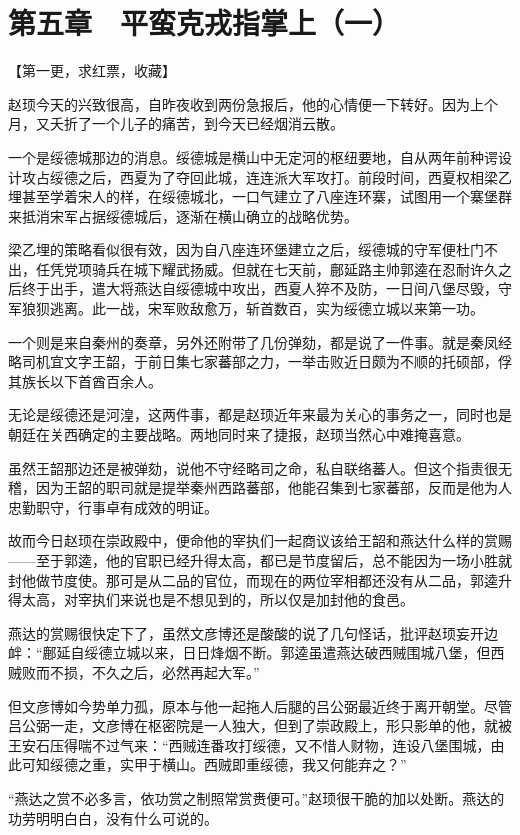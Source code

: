 \section{第五章　平蛮克戎指掌上（一）}

【第一更，求红票，收藏】

赵顼今天的兴致很高，自昨夜收到两份急报后，他的心情便一下转好。因为上个月，又夭折了一个儿子的痛苦，到今天已经烟消云散。

一个是绥德城那边的消息。绥德城是横山中无定河的枢纽要地，自从两年前种谔设计攻占绥德之后，西夏为了夺回此城，连连派大军攻打。前段时间，西夏权相梁乙埋甚至学着宋人的样，在绥德城北，一口气建立了八座连环寨，试图用一个寨堡群来抵消宋军占据绥德城后，逐渐在横山确立的战略优势。

梁乙埋的策略看似很有效，因为自八座连环堡建立之后，绥德城的守军便杜门不出，任凭党项骑兵在城下耀武扬威。但就在七天前，鄜延路主帅郭逵在忍耐许久之后终于出手，遣大将燕达自绥德城中攻出，西夏人猝不及防，一日间八堡尽毁，守军狼狈逃离。此一战，宋军败敌愈万，斩首数百，实为绥德立城以来第一功。

一个则是来自秦州的奏章，另外还附带了几份弹劾，都是说了一件事。就是秦凤经略司机宜文字王韶，于前日集七家蕃部之力，一举击败近日颇为不顺的托硕部，俘其族长以下首酋百余人。

无论是绥德还是河湟，这两件事，都是赵顼近年来最为关心的事务之一，同时也是朝廷在关西确定的主要战略。两地同时来了捷报，赵顼当然心中难掩喜意。

虽然王韶那边还是被弹劾，说他不守经略司之命，私自联络蕃人。但这个指责很无稽，因为王韶的职司就是提举秦州西路蕃部，他能召集到七家蕃部，反而是他为人忠勤职守，行事卓有成效的明证。

故而今日赵顼在崇政殿中，便命他的宰执们一起商议该给王韶和燕达什么样的赏赐——至于郭逵，他的官职已经升得太高，都已是节度留后，总不能因为一场小胜就封他做节度使。那可是从二品的官位，而现在的两位宰相都还没有从二品，郭逵升得太高，对宰执们来说也是不想见到的，所以仅是加封他的食邑。

燕达的赏赐很快定下了，虽然文彦博还是酸酸的说了几句怪话，批评赵顼妄开边衅：“鄜延自绥德立城以来，日日烽烟不断。郭逵虽遣燕达破西贼围城八堡，但西贼败而不损，不久之后，必然再起大军。”

但文彦博如今势单力孤，原本与他一起拖人后腿的吕公弼最近终于离开朝堂。尽管吕公弼一走，文彦博在枢密院是一人独大，但到了崇政殿上，形只影单的他，就被王安石压得喘不过气来：“西贼连番攻打绥德，又不惜人财物，连设八堡围城，由此可知绥德之重，实甲于横山。西贼即重绥德，我又何能弃之？”

“燕达之赏不必多言，依功赏之制照常赏赉便可。”赵顼很干脆的加以处断。燕达的功劳明明白白，没有什么可说的。

